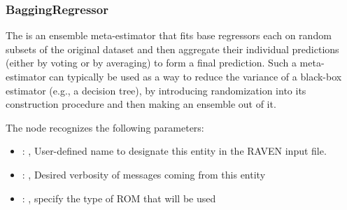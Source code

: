 \subsubsection{BaggingRegressor}
  The  is an ensemble meta-estimator that fits base regressors each on
  random subsets of the original                             dataset and then aggregate their
  individual predictions (either by voting or by averaging) to form a final
  prediction. Such a meta-estimator can typically be used as a way to reduce the variance of a
  black-box estimator                             (e.g., a decision tree), by introducing
  randomization into its construction procedure and then making an ensemble
  out of it.

  The  node recognizes the following parameters:
    \begin{itemize}
      \item {}: , 
        User-defined name to designate this entity in the RAVEN input file.
      \item {}: , 
        Desired verbosity of messages coming from this entity
      \item {}: , 
        specify the type of ROM that will be used
  \end{itemize}

